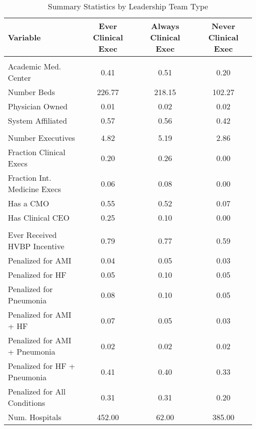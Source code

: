 \begin{table}[ht!]
\centering
\caption{\label{tab:sumstats_samples_stable}Summary Statistics by Leadership Team Type}
\centering
\begin{tabular}[t]{lccc}
\toprule
Variable & Ever Clinical Exec & Always Clinical Exec & Never Clinical Exec\\
\midrule
\addlinespace[0.3em]
\multicolumn{4}{l}{\textbf{Hospital Characteristics}}\\
\hspace{1em}Academic Med. Center & 0.41 & 0.51 & 0.20\\
\hspace{1em}Number Beds & 226.77 & 218.15 & 102.27\\
\hspace{1em}Physician Owned & 0.01 & 0.02 & 0.02\\
\hspace{1em}System Affiliated & 0.57 & 0.56 & 0.42\\
\addlinespace[0.3em]
\multicolumn{4}{l}{\textbf{Executive Team Characteristics}}\\
\hspace{1em}Number Executives & 4.82 & 5.19 & 2.86\\
\hspace{1em}Fraction Clinical Execs & 0.20 & 0.26 & 0.00\\
\hspace{1em}Fraction Int. Medicine Execs & 0.06 & 0.08 & 0.00\\
\hspace{1em}Has a CMO & 0.55 & 0.52 & 0.07\\
\hspace{1em}Has Clinical CEO & 0.25 & 0.10 & 0.00\\
\addlinespace[0.3em]
\multicolumn{4}{l}{\textbf{Penalty/Payment Variables}}\\
\hspace{1em}Ever Received HVBP Incentive & 0.79 & 0.77 & 0.59\\
\hspace{1em}Penalized for AMI & 0.04 & 0.05 & 0.03\\
\hspace{1em}Penalized for HF & 0.05 & 0.10 & 0.05\\
\hspace{1em}Penalized for Pneumonia & 0.08 & 0.10 & 0.05\\
\hspace{1em}Penalized for AMI + HF & 0.07 & 0.05 & 0.03\\
\hspace{1em}Penalized for AMI + Pneumonia & 0.02 & 0.02 & 0.02\\
\hspace{1em}Penalized for HF + Pneumonia & 0.41 & 0.40 & 0.33\\
\hspace{1em}Penalized for All Conditions & 0.31 & 0.31 & 0.20\\
Num. Hospitals & 452.00 & 62.00 & 385.00\\
\bottomrule
\end{tabular}
\end{table}
